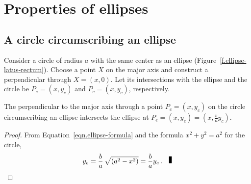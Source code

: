 

\chapter{Properties of ellipses}\label{s.ellipse}


\section{A circle circumscribing an ellipse}

Consider a circle of radius $a$ with the same center as an ellipse (Figure~\ref{f.ellipse-latus-rectum}). Choose a point $X$ on the major axis and construct a perpendicular through $X=(x,0)$. Let its intersections with the ellipse and the circle be $P_e=(x,y_e)$ and $P_c=(x,y_c)$, respectively.
\begin{theorem}\label{thm.ellipse-b-over-a}
The perpendicular to the major axis through a point $P_c=(x,y_c)$ on the circle circumscribing an ellipse intersects the ellipse at $P_e=(x,y_e)=\left(x,\displaystyle\frac{b}{a}y_c\right)$.
\end{theorem}
\begin{proof} From Equation~\ref{eqn.ellipse-formula} and the formula $x^2+y^2=a^2$ for the circle,
\begin{equation}
y_e= \frac{b}{a} \,\sqrt{(a^2-x^2)}=\frac{b}{a}y_c\,.\label{eq.ye}\fqed
\end{equation}
\end{proof}



